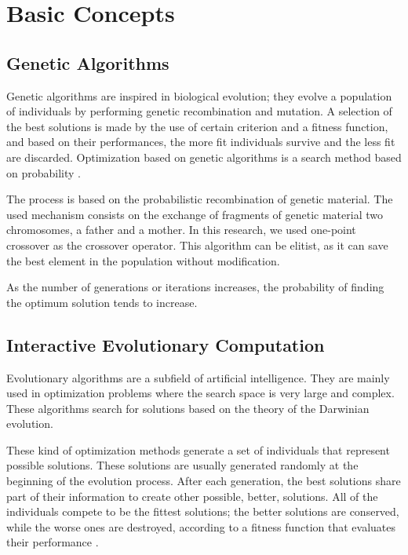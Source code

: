 \documentclass{acm_proc_article-sp}
\begin{document}
\section{Basic Concepts}

\subsection{Genetic Algorithms}
\label{GeneticAlgorithms}

Genetic algorithms are inspired in biological evolution; they
evolve a population of individuals by performing genetic
recombination and mutation. A selection of the best solutions is made
by the use of certain criterion and a fitness function, and based on
their performances, the more fit individuals survive and the less fit
are discarded. Optimization based on genetic algorithms is a search
method based on probability \cite{whitley1994genetic}.

The process is based on the probabilistic recombination of genetic
material. The used mechanism consists on the exchange of fragments of
genetic material two chromosomes, a father and a mother. In this
research, we used one-point crossover as the crossover operator. This
algorithm can be elitist, as it can save the best element in the
population without modification.

As the number of generations or iterations increases, the probability
of finding the optimum solution tends to increase.

\subsection{Interactive Evolutionary Computation}
\label{InteractiveEvolutionaryComputation}

Evolutionary algorithms are a subfield of artificial
intelligence. They are mainly used in optimization problems where the
search space is very large and complex. These algorithms search for
solutions based on the theory of the Darwinian evolution.

These kind of optimization methods generate a set of individuals that represent
possible solutions. These solutions are usually generated randomly at
the beginning of the evolution process. After each generation, the
best solutions share part of their information to create other
possible, better, solutions. All of the individuals compete to be the
fittest solutions; the better solutions are conserved, while the worse
ones are destroyed, according to a fitness function that evaluates
their performance \cite{back1996evolutionary}.
\end{document}
